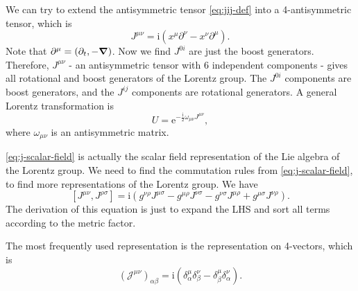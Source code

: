 \documentclass[hyperref, a4paper]{article}
\newcommand*{\ii}{\mathrm{i}}
\newcommand*{\ee}{\mathrm{e}}
\begin{document}
We can try to extend the antisymmetric tensor \eqref{eq:jij-def} into a 4-antisymmetric tensor, which is 
\begin{equation}
    J^{\mu \nu} = \ii (x^\mu \partial^\nu - x^\nu \partial^\mu).
    \label{eq:j-scalar-field}
\end{equation}
Note that $\partial^\mu = (\partial_t, - \grad)$. Now we find $J^{0 i}$ are just the boost generators.
Therefore, $J^{\mu \nu}$ - an antisymmetric tensor with 6 independent components - gives all rotational and 
boost generators of the Lorentz group. The $J^{0 i}$ components are boost generators, and the $J^{ij}$ 
components are rotational generators. A general Lorentz transformation is 
\begin{equation}
    U = \ee^{- \frac{\ii}{2} \omega_{\mu \nu} J^{\mu \nu}},
\end{equation}
where $\omega_{\mu \nu}$ is an antisymmetric matrix.

\eqref{eq:j-scalar-field} is actually the scalar field representation of the Lie algebra of the Lorentz group.
We need to find the commutation rules from \eqref{eq:j-scalar-field}, to find more representations of the 
Lorentz group. We have 
\begin{equation}
    \left[J^{\mu \nu}, J^{\rho \sigma}\right]=\ii \left(g^{\nu \rho} J^{\mu \sigma}-g^{\mu \rho} J^{\nu \sigma}-g^{\nu \sigma} J^{\mu \rho}+g^{\mu \sigma} J^{\nu \rho}\right).
    \label{eq:lorentz-algebra}
\end{equation}
The derivation of this equation is just to expand the LHS and sort all terms according to the metric factor.

The most frequently used representation is the representation on 4-vectors, which is 
\begin{equation}
    (\mathcal{J}^{\mu \nu})_{\alpha \beta} = \ii (\delta^{\mu}_\alpha \delta^{\nu}_\beta - \delta^\mu_\beta \delta^\nu_\alpha).
    \label{eq:four-vec-lorentz}
\end{equation}
\end{document}
